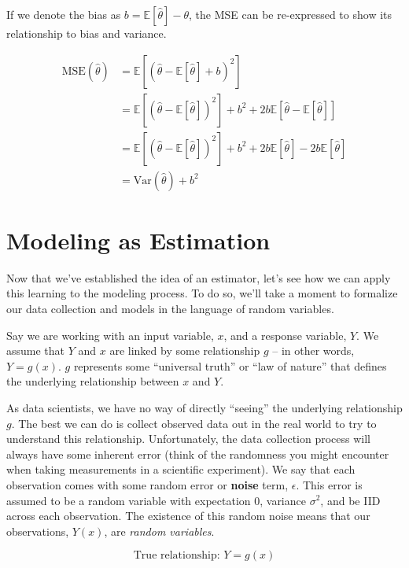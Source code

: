 \documentclass[
  letterpaper,
  DIV=11,
  numbers=noendperiod]{scrreprt}
\begin{document}
If we denote the bias as \(b = \mathbb{E}[\hat{\theta}] - \theta\), the
MSE can be re-expressed to show its relationship to bias and variance.

\[\begin{align}
\text{MSE}(\hat{\theta}) &= \mathbb{E}\left[(\hat{\theta} - \mathbb{E}[\hat{\theta}] + b)^2 \right] \\
&= \mathbb{E}\left[(\hat{\theta} - \mathbb{E}[\hat{\theta}])^2\right] + b^2 + 2b\mathbb{E}\left[\hat{\theta} - \mathbb{E}[\hat{\theta}]\right] \\
&= \mathbb{E}\left[(\hat{\theta} - \mathbb{E}[\hat{\theta}])^2\right] + b^2 + 2b\mathbb{E}[\hat{\theta}] - 2b\mathbb{E}[\hat{\theta}] \\
&= \text{Var}(\hat{\theta}) + b^2
\end{align}\]

\hypertarget{modeling-as-estimation}{%
\section{Modeling as Estimation}\label{modeling-as-estimation}}

Now that we've established the idea of an estimator, let's see how we
can apply this learning to the modeling process. To do so, we'll take a
moment to formalize our data collection and models in the language of
random variables.

Say we are working with an input variable, \(x\), and a response
variable, \(Y\). We assume that \(Y\) and \(x\) are linked by some
relationship \(g\) -- in other words, \(Y = g(x)\). \(g\) represents
some ``universal truth'' or ``law of nature'' that defines the
underlying relationship between \(x\) and \(Y\).

As data scientists, we have no way of directly ``seeing'' the underlying
relationship \(g\). The best we can do is collect observed data out in
the real world to try to understand this relationship. Unfortunately,
the data collection process will always have some inherent error (think
of the randomness you might encounter when taking measurements in a
scientific experiment). We say that each observation comes with some
random error or \textbf{noise} term, \(\epsilon\). This error is assumed
to be a random variable with expectation 0, variance \(\sigma^2\), and
be IID across each observation. The existence of this random noise means
that our observations, \(Y(x)\), are \emph{random variables}.

\[\text{True relationship: }Y = g(x)\]
\end{document}
